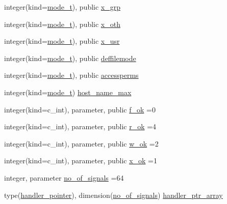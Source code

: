 \begin{DoxyCompactItemize}
\item 
integer(kind=\mbox{\hyperlink{namespacem__system_abdb5cc27c945379d844db4830d499050}{mode\+\_\+t}}), public \mbox{\hyperlink{namespacem__system_ae405a76caed1088a151c437d66d80eb0}{x\+\_\+grp}}
\item 
integer(kind=\mbox{\hyperlink{namespacem__system_abdb5cc27c945379d844db4830d499050}{mode\+\_\+t}}), public \mbox{\hyperlink{namespacem__system_a5863ec37dc7d85f9c3f20cc511d26bb4}{x\+\_\+oth}}
\item 
integer(kind=\mbox{\hyperlink{namespacem__system_abdb5cc27c945379d844db4830d499050}{mode\+\_\+t}}), public \mbox{\hyperlink{namespacem__system_a450a3fddafad75b241f370b47b17d97c}{x\+\_\+usr}}
\item 
integer(kind=\mbox{\hyperlink{namespacem__system_abdb5cc27c945379d844db4830d499050}{mode\+\_\+t}}), public \mbox{\hyperlink{namespacem__system_a04a5b1ef384bcbb8ad3b0c81ce95001a}{deffilemode}}
\item 
integer(kind=\mbox{\hyperlink{namespacem__system_abdb5cc27c945379d844db4830d499050}{mode\+\_\+t}}), public \mbox{\hyperlink{namespacem__system_a82a13cb7ac2c5f0e6e34fc3cfc010d42}{accessperms}}
\item 
integer(kind=\mbox{\hyperlink{namespacem__system_abdb5cc27c945379d844db4830d499050}{mode\+\_\+t}}) \mbox{\hyperlink{namespacem__system_a6501a3671053239dae9b69b95c0a5f55}{host\+\_\+name\+\_\+max}}
\item 
integer(kind=c\+\_\+int), parameter, public \mbox{\hyperlink{namespacem__system_ad34c4f18dd5b7dbe445cca25bbae9a74}{f\+\_\+ok}} =0
\item 
integer(kind=c\+\_\+int), parameter, public \mbox{\hyperlink{namespacem__system_a86ca380e22d30a8795b4d99f1836ece8}{r\+\_\+ok}} =4
\item 
integer(kind=c\+\_\+int), parameter, public \mbox{\hyperlink{namespacem__system_a8f34e61e94106b90ca48b9ef1165474c}{w\+\_\+ok}} =2
\item 
integer(kind=c\+\_\+int), parameter, public \mbox{\hyperlink{namespacem__system_a0eca0d5b431ad6fbde6f40407550e7aa}{x\+\_\+ok}} =1
\item 
integer, parameter \mbox{\hyperlink{namespacem__system_a4a9ba51ff75a0a6176f31e0562d0a058}{no\+\_\+of\+\_\+signals}} =64
\item 
type(\mbox{\hyperlink{structm__system_1_1handler__pointer}{handler\+\_\+pointer}}), dimension(\mbox{\hyperlink{namespacem__system_a4a9ba51ff75a0a6176f31e0562d0a058}{no\+\_\+of\+\_\+signals}}) \mbox{\hyperlink{namespacem__system_a2da68c4639de85352f306b0e39debf77}{handler\+\_\+ptr\+\_\+array}}
\end{DoxyCompactItemize}


